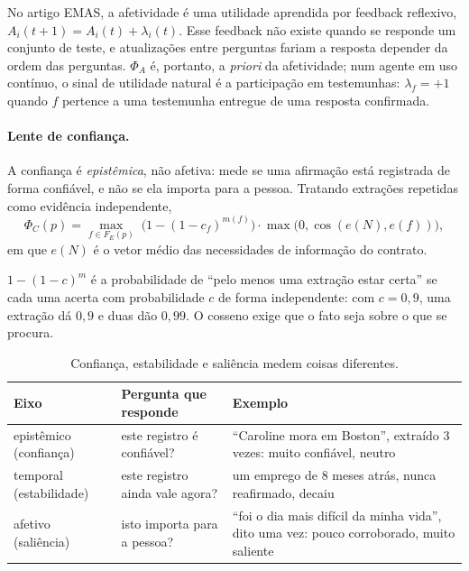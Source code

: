 \documentclass[11pt]{article}
\begin{document}
No artigo EMAS, a afetividade é uma utilidade aprendida por feedback
reflexivo, $A_i(t+1)=A_i(t)+\lambda_i(t)$. Esse feedback não existe quando se
responde um conjunto de teste, e atualizações entre perguntas fariam a
resposta depender da ordem das perguntas. $\Phi_A$ é, portanto, a
\emph{priori} da afetividade; num agente em uso contínuo, o sinal de
utilidade natural é a participação em testemunhas: $\lambda_f=+1$ quando $f$
pertence a uma testemunha entregue de uma resposta confirmada.

\paragraph{Lente de confiança.}
A confiança é \emph{epistêmica}, não afetiva: mede se uma afirmação está
registrada de forma confiável, e não se ela importa para a pessoa. Tratando
extrações repetidas como evidência independente,
\begin{equation}
  \Phi_C(p)=\max_{f\in F_E(p)}\;\bigl(1-(1-c_f)^{m(f)}\bigr)\cdot
  \max\bigl(0,\cos(e(N),e(f))\bigr),
  \label{eq:confianca}
\end{equation}
em que $e(N)$ é o vetor médio das necessidades de informação do contrato.

\begin{empalavras}
$1-(1-c)^m$ é a probabilidade de ``pelo menos uma extração estar certa'' se
cada uma acerta com probabilidade $c$ de forma independente: com $c=0{,}9$,
uma extração dá $0{,}9$ e duas dão $0{,}99$. O cosseno exige que o fato seja
sobre o que se procura.
\end{empalavras}

\begin{table}[h]
\centering\small
\caption{Confiança, estabilidade e saliência medem coisas diferentes.}
\begin{tabularx}{\textwidth}{@{}l>{\raggedright}X>{\raggedright\arraybackslash}X@{}}
\toprule
Eixo & Pergunta que responde & Exemplo \\
\midrule
epistêmico (confiança) & este registro é confiável? & ``Caroline mora em Boston'', extraído 3 vezes: muito confiável, neutro \\
temporal (estabilidade) & este registro ainda vale agora? & um emprego de 8 meses atrás, nunca reafirmado, decaiu \\
afetivo (saliência) & isto importa para a pessoa? & ``foi o dia mais difícil da minha vida'', dito uma vez: pouco corroborado, muito saliente \\
\bottomrule
\end{tabularx}
\end{table}
\end{document}
